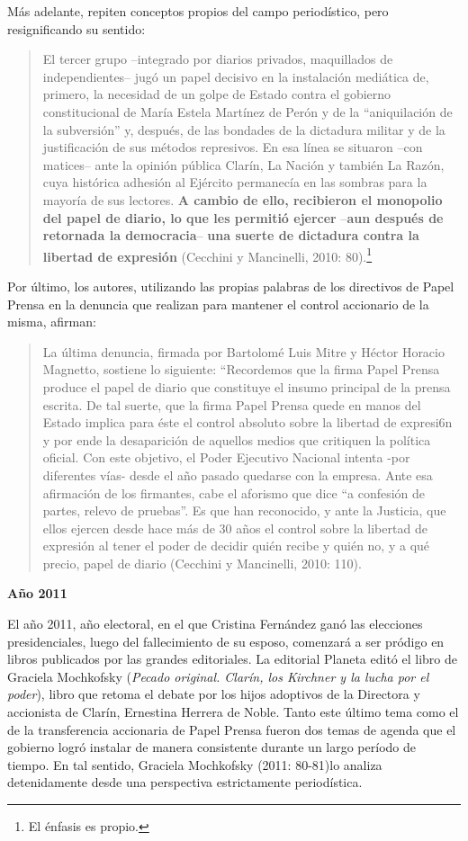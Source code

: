 {Más adelante, repiten conceptos propios del campo periodístico, pero resignificando su sentido:

\begin{quote}
El tercer grupo --integrado por diarios privados, maquillados de independientes-- jugó un papel decisivo en la instalación mediática de, primero, la necesidad de un golpe de Estado contra el gobierno constitucional de María Estela Martínez de Perón y de la ``aniquilación de la subversión'' y, después, de las bondades de la dictadura militar y de la justificación de sus métodos represivos. En esa línea se situaron --con matices-- ante la opinión pública Clarín, La Nación y también La Razón, cuya histórica adhesión al Ejército permanecía en las sombras para la mayoría de sus lectores. \textbf{A cambio de ello, recibieron el monopolio del papel de diario, lo que les permitió ejercer} --\textbf{aun después de retornada la democracia}-- \textbf{una suerte de dictadura contra la libertad de expresión} (Cecchini y Mancinelli, 2010: 80).\footnote{El énfasis es propio.}
\end{quote}

Por último, los autores, utilizando las propias palabras de los directivos de Papel Prensa en la denuncia que realizan para mantener el control accionario de la misma, afirman:

\begin{quote}
La última denuncia, firmada por Bartolomé Luis Mitre y Héctor Horacio Magnetto, sostiene lo siguiente: ``Recordemos que la firma Papel Prensa produce el papel de diario que constituye el insumo principal de la prensa escrita. De tal suerte, que la firma Papel Prensa quede en manos del Estado implica para éste el control absoluto sobre la libertad de expresi6n y por ende la desaparición de aquellos medios que critiquen la política oficial. Con este objetivo, el Poder Ejecutivo Nacional intenta -por diferentes vías- desde el año pasado quedarse con la empresa. Ante esa afirmación de los firmantes, cabe el aforismo que dice ``a confesión de partes, relevo de pruebas''. Es que han reconocido, y ante la Justicia, que ellos ejercen desde hace más de 30 años el control sobre la libertad de expresión al tener el poder de decidir quién recibe y quién no, y a qué precio, papel de diario (Cecchini y Mancinelli, 2010: 110).
\end{quote}

\textbf{Año 2011}

El año 2011, año electoral, en el que Cristina Fernández ganó las elecciones presidenciales, luego del fallecimiento de su esposo, comenzará a ser pródigo en libros publicados por las grandes editoriales. La editorial Planeta editó el libro de Graciela Mochkofsky (\emph{Pecado original. Clarín, los Kirchner y la lucha por el poder}), libro que retoma el debate por los hijos adoptivos de la Directora y accionista de Clarín, Ernestina Herrera de Noble. Tanto este último tema como el de la transferencia accionaria de Papel Prensa fueron dos temas de agenda que el gobierno logró instalar de manera consistente durante un largo período de tiempo. En tal sentido, Graciela Mochkofsky (2011: 80-81)lo analiza detenidamente desde una perspectiva estrictamente periodística.

}
